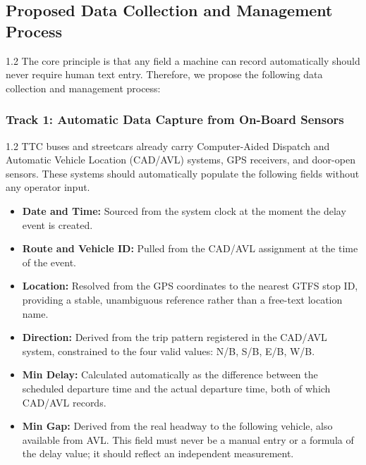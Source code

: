 \documentclass[11pt]{article}
\begin{document}
\subsection{Proposed Data Collection and Management Process}
\vspace{-0.5em}

\begin{spacing}{1.2}
The core principle is that any field a machine can record automatically should never require human text entry.
Therefore, we propose the following data collection and management process:
\end{spacing}
\vspace{-0.5em}
\subsubsection{Track 1: Automatic Data Capture from On-Board Sensors}
\vspace{-0.25em}
\begin{spacing}{1.2}
    TTC buses and streetcars already carry Computer-Aided Dispatch and Automatic Vehicle Location
    (CAD/AVL) systems, GPS receivers, and door-open sensors. These systems should automatically
    populate the following fields without any operator input.
    
    \begin{itemize}[leftmargin=2em]
        \item \textbf{Date and Time:} Sourced from the system clock at the moment the delay event is
        created.
        \item \textbf{Route and Vehicle ID:} Pulled from the CAD/AVL assignment at the time of the event.
        \item \textbf{Location:} Resolved from the GPS coordinates to the nearest GTFS stop ID, providing a
        stable, unambiguous reference rather than a free-text location name.
        \item \textbf{Direction:} Derived from the trip pattern registered in the CAD/AVL system, constrained
        to the four valid values: N/B, S/B, E/B, W/B.
        \item \textbf{Min Delay:} Calculated automatically as the difference between the scheduled departure
        time and the actual departure time, both of which CAD/AVL records.
        \item \textbf{Min Gap:} Derived from the real headway to the following vehicle, also available from
        AVL. This field must never be a manual entry or a formula of the delay value; it should
        reflect an independent measurement.
    \end{itemize}
\end{spacing}
\vspace{-0.5em}
\end{document}

